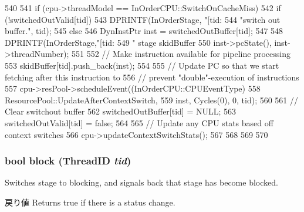 \begin{DoxyCode}
540 {    
541     if (cpu->threadModel == InOrderCPU::SwitchOnCacheMiss) {
542         if (!switchedOutValid[tid]) {
543             DPRINTF(InOrderStage, "[tid:%
544                     "switch out buffer.\n", tid);        
545         } else {
546             DynInstPtr inst = switchedOutBuffer[tid];
547 
548             DPRINTF(InOrderStage,"[tid:%
549                     " stage skidBuffer %
550                     inst->pcState(), inst->threadNumber);
551 
552             // Make instruction available for pipeline processing
553             skidBuffer[tid].push_back(inst);
554 
555             // Update PC so that we start fetching after this instruction to
556             // prevent "double"-execution of instructions
557             cpu->resPool->scheduleEvent((InOrderCPU::CPUEventType)
558                                         ResourcePool::UpdateAfterContextSwitch, 
559                                         inst, Cycles(0), 0, tid);
560 
561             // Clear switchout buffer
562             switchedOutBuffer[tid] = NULL;
563             switchedOutValid[tid] = false;            
564 
565             // Update any CPU stats based off context switches
566             cpu->updateContextSwitchStats();            
567         }        
568     }
569     
570 }
\end{DoxyCode}
\hypertarget{classPipelineStage_ad1993925abd15d3fb59fde2ccfa3d678}{
\subsubsection[{block}]{\setlength{\rightskip}{0pt plus 5cm}bool block ({\bf ThreadID} {\em tid})}}
\label{classPipelineStage_ad1993925abd15d3fb59fde2ccfa3d678}
Switches stage to blocking, and signals back that stage has become blocked. \begin{DoxyReturn}{戻り値}
Returns true if there is a status change. 
\end{DoxyReturn}



